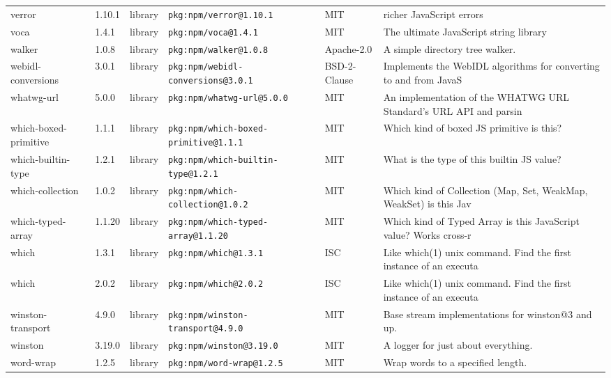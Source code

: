 \documentclass[11pt,a4paper]{article}
\begin{document}
\begin{longtable}{|p{4cm}|p{2cm}|p{1.6cm}|p{5cm}|p{1.5cm}|p{3.5cm}|}
\raggedright verror & 1.10.1 & library & \small\texttt{pkg:npm/verror@1.10.1} & MIT & \small richer JavaScript errors \\
\raggedright voca & 1.4.1 & library & \small\texttt{pkg:npm/voca@1.4.1} & MIT & \small The ultimate JavaScript string library \\
\raggedright walker & 1.0.8 & library & \small\texttt{pkg:npm/walker@1.0.8} & Apache-2.0 & \small A simple directory tree walker. \\
\raggedright webidl-conversions & 3.0.1 & library & \small\texttt{pkg:npm/webidl-conversions@3.0.1} & BSD-2-Clause & \small Implements the WebIDL algorithms for converting to and from JavaS \\
\raggedright whatwg-url & 5.0.0 & library & \small\texttt{pkg:npm/whatwg-url@5.0.0} & MIT & \small An implementation of the WHATWG URL Standard's URL API and parsin \\
\raggedright which-boxed-primitive & 1.1.1 & library & \small\texttt{pkg:npm/which-boxed-primitive@1.1.1} & MIT & \small Which kind of boxed JS primitive is this? \\
\raggedright which-builtin-type & 1.2.1 & library & \small\texttt{pkg:npm/which-builtin-type@1.2.1} & MIT & \small What is the type of this builtin JS value? \\
\raggedright which-collection & 1.0.2 & library & \small\texttt{pkg:npm/which-collection@1.0.2} & MIT & \small Which kind of Collection (Map, Set, WeakMap, WeakSet) is this Jav \\
\raggedright which-typed-array & 1.1.20 & library & \small\texttt{pkg:npm/which-typed-array@1.1.20} & MIT & \small Which kind of Typed Array is this JavaScript value? Works cross-r \\
\raggedright which & 1.3.1 & library & \small\texttt{pkg:npm/which@1.3.1} & ISC & \small Like which(1) unix command. Find the first instance of an executa \\
\raggedright which & 2.0.2 & library & \small\texttt{pkg:npm/which@2.0.2} & ISC & \small Like which(1) unix command. Find the first instance of an executa \\
\raggedright winston-transport & 4.9.0 & library & \small\texttt{pkg:npm/winston-transport@4.9.0} & MIT & \small Base stream implementations for winston@3 and up. \\
\raggedright winston & 3.19.0 & library & \small\texttt{pkg:npm/winston@3.19.0} & MIT & \small A logger for just about everything. \\
\raggedright word-wrap & 1.2.5 & library & \small\texttt{pkg:npm/word-wrap@1.2.5} & MIT & \small Wrap words to a specified length. \\

\end{longtable}
\end{document}
